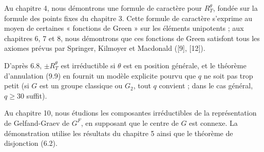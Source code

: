 \documentclass[9pt,twoside]{extarticle}
\begin{document}
{Au chapitre 4, nous démontrons une formule de caractère pour \(R_T^\theta\), fondée sur la formule des points fixes du chapitre 3. Cette formule de caractère s'exprime au moyen de certaines « fonctions de Green » sur les éléments unipotents ; aux chapitres 6, 7 et 8, nous démontrons que ces fonctions de Green satisfont tous les axiomes prévus par Springer, Kilmoyer et Macdonald ([9], [12]).\par

D'après 6.8, \(\pm R_T^\theta\) est irréductible si \(\theta\) est en position générale, et le théorème d'annulation (9.9) en fournit un modèle explicite pourvu que \(q\) ne soit pas trop petit (si \(G\) est un groupe classique ou \(G_2\), tout \(q\) convient ; dans le cas général, \(q\geq 30\) suffit).\par

Au chapitre 10, nous étudions les composantes irréductibles de la représentation de Gelfand-Graev de \(G^F\), en supposant que le centre de \(G\) est connexe. La démonstration utilise les résultats du chapitre 5 ainsi que le théorème de disjonction (6.2).\par
}
\end{document}
